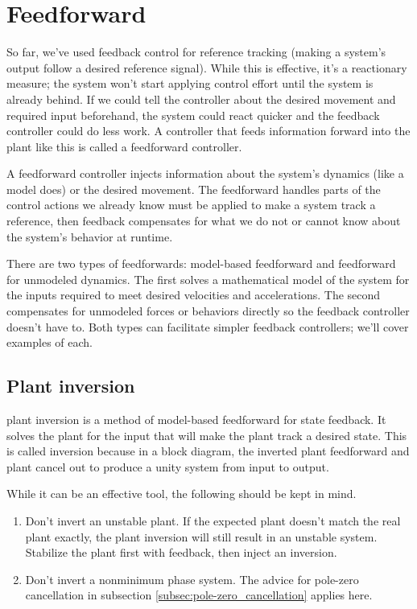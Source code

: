 \section{Feedforward}

So far, we've used feedback control for \gls{reference} \gls{tracking} (making a
\gls{system}'s output follow a desired \gls{reference} signal). While this is
effective, it's a reactionary measure; the \gls{system} won't start applying
\gls{control effort} until the \gls{system} is already behind. If we could tell
the \gls{controller} about the desired movement and required input beforehand,
the \gls{system} could react quicker and the feedback \gls{controller} could do
less work. A \gls{controller} that feeds information forward into the
\gls{plant} like this is called a \gls{feedforward controller}.

A \gls{feedforward controller} injects information about the \gls{system}'s
dynamics (like a \gls{model} does) or the desired movement. The feedforward
handles parts of the control actions we already know must be applied to make a
\gls{system} track a \gls{reference}, then feedback compensates for what we do
not or cannot know about the \gls{system}'s behavior at runtime.

There are two types of feedforwards: model-based feedforward and feedforward for
unmodeled dynamics. The first solves a mathematical model of the system for the
inputs required to meet desired velocities and accelerations. The second
compensates for unmodeled forces or behaviors directly so the feedback
controller doesn't have to. Both types can facilitate simpler feedback
controllers; we'll cover examples of each.

\subsection{Plant inversion}
\label{subsec:plant_inversion}

\Gls{plant} inversion is a method of model-based feedforward for \gls{state}
feedback. It solves the \gls{plant} for the input that will make the \gls{plant}
track a desired state. This is called inversion because in a block diagram, the
inverted \gls{plant} feedforward and \gls{plant} cancel out to produce a unity
system from input to output.

While it can be an effective tool, the following should be kept in mind.
\begin{enumerate}
  \item Don't invert an unstable \gls{plant}. If the expected \gls{plant}
    doesn't match the real \gls{plant} exactly, the \gls{plant} inversion will
    still result in an unstable \gls{system}. Stabilize the \gls{plant} first
    with feedback, then inject an inversion.
  \item Don't invert a nonminimum phase system. The advice for pole-zero
    cancellation in subsection \ref{subsec:pole-zero_cancellation} applies here.
\end{enumerate}

